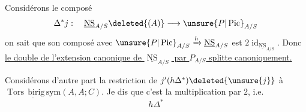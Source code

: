
Considérons le composé
\[
\Delta^*j:\quad\underline{\operatorname{NS}}_{A/S}\deleted{(A)}\longrightarrow\unsure{P|\operatorname{Pic}}_{A/S}
\]
on sait que son composé avec $\unsure{P|\operatorname{Pic}}_{A/S}\xrightarrow{h}\underline{\operatorname{NS}}_{A/S}$ est $2\operatorname{id}_{\underline{\operatorname{NS}}_{A/S}}$. Donc \uline{le double de l'extension canonique de $\underline{\operatorname{NS}}_{A/S}$ par $P_{A/S}$ splitte canoniquement.}


Considérons d'autre part la restriction de $j'(h\Delta^*)\deleted{\unsure{j}}$ à $\underline{\operatorname{Tors}\,\mathrm{birig}\,\mathrm{sym}}(A,A;C)$.
Je dis que c'est la multiplication par $2$, i.e.
\[
h\Delta^*
\]

